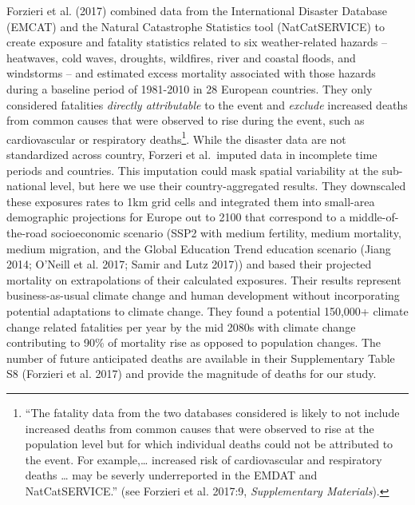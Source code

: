 \documentclass[12pt,]{article}
\begin{document}
Forzieri et al. (2017) combined data from the International Disaster
Database (EMCAT) and the Natural Catastrophe Statistics tool
(NatCatSERVICE) to create exposure and fatality statistics related to
six weather-related hazards -- heatwaves, cold waves, droughts,
wildfires, river and coastal floods, and windstorms -- and estimated
excess mortality associated with those hazards during a baseline period
of 1981-2010 in 28 European countries. They only considered fatalities
\emph{directly attributable} to the event and \emph{exclude} increased
deaths from common causes that were observed to rise during the event,
such as cardiovascular or respiratory deaths\footnote{``The fatality
  data from the two databases considered is likely to not include
  increased deaths from common causes that were observed to rise at the
  population level but for which individual deaths could not be
  attributed to the event. For example,\ldots{} increased risk of
  cardiovascular and respiratory deaths \ldots{} may be severly
  underreported in the EMDAT and NatCatSERVICE.'' (see Forzieri et al.
  2017:9, \emph{Supplementary Materials}).}. While the disaster data are
not standardized across country, Forzeri et al.~imputed data in
incomplete time periods and countries. This imputation could mask
spatial variability at the sub-national level, but here we use their
country-aggregated results. They downscaled these exposures rates to 1km
grid cells and integrated them into small-area demographic projections
for Europe out to 2100 that correspond to a middle-of-the-road
socioeconomic scenario (SSP2 with medium fertility, medium mortality,
medium migration, and the Global Education Trend education scenario
(Jiang 2014; O'Neill et al. 2017; Samir and Lutz 2017)) and based their
projected mortality on extrapolations of their calculated exposures.
Their results represent business-as-usual climate change and human
development without incorporating potential adaptations to climate
change. They found a potential 150,000+ climate change related
fatalities per year by the mid 2080s with climate change contributing to
90\% of mortality rise as opposed to population changes. The number of
future anticipated deaths are available in their Supplementary Table S8
(Forzieri et al. 2017) and provide the magnitude of deaths for our
study.
\end{document}
